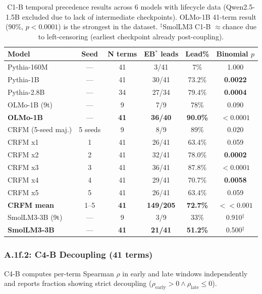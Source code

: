 \documentclass[10pt]{article} %
\begin{document}
\begin{table}[H]
\centering
\small
\begin{tabular}{|l|c|c|c|c|c|}
\hline
\textbf{Model} & \textbf{Seed} & \textbf{N terms} & \textbf{EB$^*$ leads} & \textbf{Lead\%} & \textbf{Binomial $p$} \\
\hline
Pythia-160M & --- & 41 & 3/41 & 7\% & 1.000 \\
Pythia-1B & --- & 41 & 30/41 & 73.2\% & \textbf{0.0022} \\
Pythia-2.8B & --- & 34 & 27/34 & 79.4\% & \textbf{0.0004} \\
OLMo-1B (9t) & --- & 9 & 7/9 & 78\% & 0.090 \\
\textbf{OLMo-1B} & --- & \textbf{41} & \textbf{36/40} & \textbf{90.0\%} & $\mathbf{<0.0001}$ \\
CRFM (5-seed maj.) & 5 seeds & 9 & 8/9 & 89\% & 0.020 \\
CRFM x1 & 1 & 41 & 26/41 & 63.4\% & 0.059 \\
CRFM x2 & 2 & 41 & 32/41 & 78.0\% & \textbf{0.0002} \\
CRFM x3 & 3 & 41 & 36/41 & 87.8\% & $\mathbf{<0.0001}$ \\
CRFM x4 & 4 & 41 & 29/41 & 70.7\% & \textbf{0.0058} \\
CRFM x5 & 5 & 41 & 26/41 & 63.4\% & 0.059 \\
\textbf{CRFM mean} & 1--5 & \textbf{41} & \textbf{149/205} & \textbf{72.7\%} & $\mathbf{<<0.001}$ \\
SmolLM3-3B (9t) & --- & 9 & 3/9 & 33\% & 0.910$^\ddagger$ \\
\textbf{SmolLM3-3B} & --- & \textbf{41} & \textbf{21/41} & \textbf{51.2\%} & 0.500$^\ddagger$ \\
\hline
\end{tabular}
\caption{C1-B temporal precedence results across 6 models with lifecycle data (Qwen2.5-1.5B excluded due to lack of intermediate checkpoints). OLMo-1B 41-term result (90\%, $p<0.0001$) is the strongest in the dataset. $^\ddagger$SmolLM3 C1-B $\approx$chance due to left-censoring (earliest checkpoint already post-coupling).}
\label{tab:a1f1_c1b}
\end{table}

\subsubsection*{A.1f.2: C4-B Decoupling (41 terms)}

C4-B computes per-term Spearman $\rho$ in early and late windows independently and reports fraction showing strict decoupling ($\rho_{\text{early}} > 0 \land \rho_{\text{late}} \leq 0$).
\end{document}
